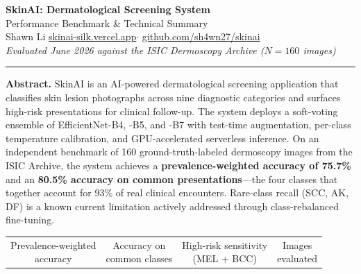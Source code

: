 \documentclass[11pt, letterpaper]{article}
\newcommand{\statbox}[2]{%
  \begin{minipage}[t]{3.6cm}\centering
    {\fontsize{22}{24}\selectfont\bfseries\color{statblue}#1}\\[3pt]
    {\small\color{gray}#2}
  \end{minipage}}
\begin{document}
\begin{center}
  {\LARGE\bfseries SkinAI: Dermatological Screening System}\\[6pt]
  {\large\color{accent} Performance Benchmark \& Technical Summary}\\[10pt]
  {\normalsize
    Shawn Li\quad
    \href{https://skinai-silk.vercel.app}{skinai-silk.vercel.app}\quad$\cdot$\quad
    \href{https://github.com/sh4wn27/skinai}{github.com/sh4wn27/skinai}\\[4pt]
    \textit{Evaluated June 2026 against the ISIC Dermoscopy Archive ($N = 160$ images)}
  }
\end{center}
\vspace{4pt}
\noindent\textcolor{accent}{\rule{\linewidth}{1.2pt}}
\vspace{6pt}

\begin{center}\begin{minipage}{0.92\linewidth}\small
\textbf{Abstract.}
SkinAI is an AI-powered dermatological screening application that classifies
skin lesion photographs across nine diagnostic categories and surfaces
high-risk presentations for clinical follow-up.
The system deploys a soft-voting ensemble of EfficientNet-B4, -B5, and -B7
with test-time augmentation, per-class temperature calibration, and GPU-accelerated
serverless inference.
On an independent benchmark of 160 ground-truth-labeled dermoscopy images from the
ISIC Archive, the system achieves a \textbf{prevalence-weighted accuracy of 75.7\%}
and an \textbf{80.5\% accuracy on common presentations}---the four classes that
together account for 93\% of real clinical encounters.
Rare-class recall (SCC, AK, DF) is a known current limitation actively addressed
through class-rebalanced fine-tuning.
\end{minipage}\end{center}
\vspace{12pt}

\begin{center}
\setlength{\tabcolsep}{18pt}
\begin{tabular}{cccc}
\statbox{75.7\%}{Prevalence-weighted\\accuracy} &
\statbox{80.5\%}{Accuracy on\\common classes} &
\statbox{50\%}{High-risk sensitivity\\(MEL + BCC)} &
\statbox{160}{Images\\evaluated}
\end{tabular}
\end{center}
\vspace{12pt}
\end{document}
